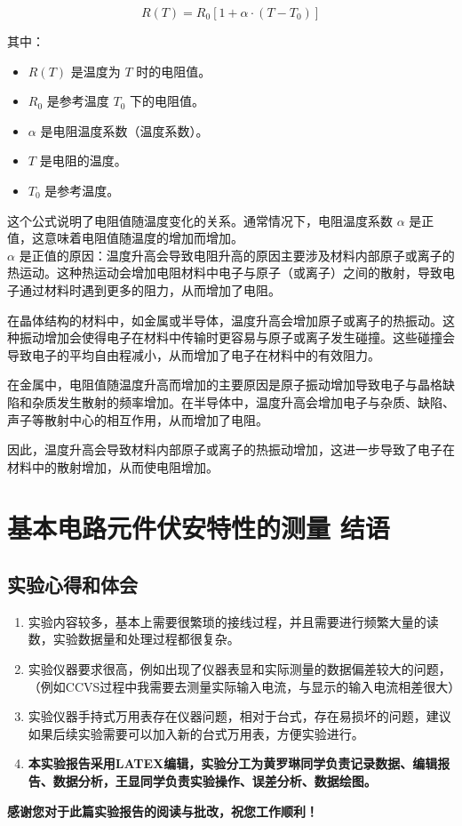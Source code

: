 \documentclass[dvipsnames, svgnames,a4paper,11pt]{article}
\begin{document}
\[ R(T) = R_0 \left[1 + \alpha \cdot (T - T_0)\right] \]

其中：
\begin{itemize}
    \item \( R(T) \) 是温度为 \( T \) 时的电阻值。
    \item \( R_0 \) 是参考温度 \( T_0 \) 下的电阻值。
    \item \( \alpha \) 是电阻温度系数（温度系数）。
    \item \( T \) 是电阻的温度。
    \item \( T_0 \) 是参考温度。
\end{itemize}

这个公式说明了电阻值随温度变化的关系。通常情况下，电阻温度系数 \( \alpha \) 是正值，这意味着电阻值随温度的增加而增加。\\
\( \alpha \) 是正值的原因：温度升高会导致电阻升高的原因主要涉及材料内部原子或离子的热运动。这种热运动会增加电阻材料中电子与原子（或离子）之间的散射，导致电子通过材料时遇到更多的阻力，从而增加了电阻。

在晶体结构的材料中，如金属或半导体，温度升高会增加原子或离子的热振动。这种振动增加会使得电子在材料中传输时更容易与原子或离子发生碰撞。这些碰撞会导致电子的平均自由程减小，从而增加了电子在材料中的有效阻力。

在金属中，电阻值随温度升高而增加的主要原因是原子振动增加导致电子与晶格缺陷和杂质发生散射的频率增加。在半导体中，温度升高会增加电子与杂质、缺陷、声子等散射中心的相互作用，从而增加了电阻。

因此，温度升高会导致材料内部原子或离子的热振动增加，这进一步导致了电子在材料中的散射增加，从而使电阻增加。
	
	
	\clearpage
	
	\section{基本电路元件伏安特性的测量 \quad\heiti 结语}
	
	\subsection{实验心得和体会}
	\begin{enumerate}
		\item 实验内容较多，基本上需要很繁琐的接线过程，并且需要进行频繁大量的读数，实验数据量和处理过程都很复杂。
		\item 实验仪器要求很高，例如出现了仪器表显和实际测量的数据偏差较大的问题，（例如CCVS过程中我需要去测量实际输入电流，与显示的输入电流相差很大）
		\item 实验仪器手持式万用表存在仪器问题，相对于台式，存在易损坏的问题，建议如果后续实验需要可以加入新的台式万用表，方便实验进行。
		\item \textbf{本实验报告采用LATEX编辑，实验分工为黄罗琳同学负责记录数据、编辑报告、数据分析，王显同学负责实验操作、误差分析、数据绘图。}
	\end{enumerate}
	\quad \large \textbf{感谢您对于此篇实验报告的阅读与批改，祝您工作顺利！}
	
\end{document}
